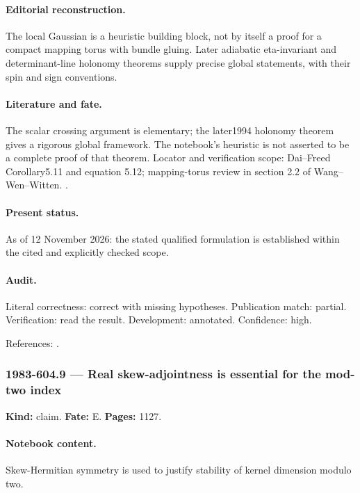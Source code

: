\paragraph{Editorial reconstruction.} The local Gaussian is a heuristic building block, not by itself a proof for a compact mapping torus with bundle gluing. Later adiabatic eta-invariant and determinant-line holonomy theorems supply precise global statements, with their spin and sign conventions.

\paragraph{Literature and fate.} The scalar crossing argument is elementary; the later1994 holonomy theorem gives a rigorous global framework. The notebook's heuristic is not asserted to be a complete proof of that theorem. Locator and verification scope: Dai--Freed Corollary5.11 and equation 5.12; mapping-torus review in section 2.2 of Wang--Wen--Witten. \cite{daifreed1994eta,wangwenwitten2019new}.

\paragraph{Present status.} As of 12 November 2026: the stated qualified formulation is established within the cited and explicitly checked scope.

\paragraph{Audit.} Literal correctness: correct with missing hypotheses. Publication match: partial. Verification: read the result. Development: annotated. Confidence: high.

\noindent References: \citep{daifreed1994eta,wangwenwitten2019new}.\par

\subsubsection{1983-604.9 --- Real skew-adjointness is essential for the mod-two index}

\label{item:1983-604.9}

\noindent\textbf{Kind:} claim. \textbf{Fate:} E. \textbf{Pages:} 1127.\par

\paragraph{Notebook content.} Skew-Hermitian symmetry is used to justify stability of kernel dimension modulo two.

